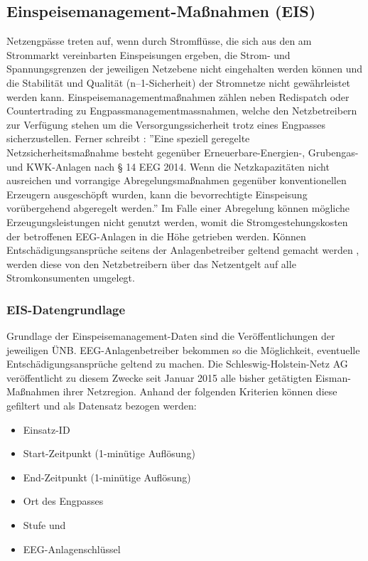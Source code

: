 \documentclass[onecolumn,10pt,titlepage]{article}
\begin{document}
\subsection{Einspeisemanagement-Maßnahmen (EIS)}
Netzengpässe treten auf, wenn durch Stromflüsse, die sich aus den am Strommarkt vereinbarten Einspeisungen ergeben, die Strom- und Spannungsgrenzen der jeweiligen Netzebene  nicht eingehalten werden können und die Stabilität und Qualität (n–1-Sicherheit) der Stromnetze nicht gewährleistet werden kann. Einspeisemanagementmaßnahmen zählen neben Redispatch oder Countertrading zu Engpassmanagementmassnahmen, welche den Netzbetreibern zur Verfügung stehen um die Versorgungssicherheit trotz eines Engpasses sicherzustellen. Ferner schreibt \cite{Zapf.2017}: ''Eine speziell geregelte Netzsicherheitsmaßnahme besteht gegenüber Erneuerbare-Energien-, Grubengas- und KWK-Anlagen nach § 14 EEG 2014. Wenn die Netzkapazitäten nicht ausreichen und vorrangige Abregelungsmaßnahmen gegenüber konventionellen Erzeugern ausgeschöpft wurden, kann die bevorrechtigte Einspeisung vorübergehend abgeregelt werden.'' Im Falle einer Abregelung können mögliche Erzeugungsleistungen nicht genutzt werden, womit die Stromgestehungskosten der betroffenen EEG-Anlagen in die Höhe getrieben werden. Können Entschädigungsansprüche seitens der Anlagenbetreiber geltend gemacht werden , werden diese von den Netzbetreibern über das Netzentgelt auf alle Stromkonsumenten umgelegt.
\subsubsection{EIS-Datengrundlage}
Grundlage der Einspeisemanagement-Daten sind die Veröffentlichungen der jeweiligen ÜNB. EEG-Anlagenbetreiber bekommen so die Möglichkeit, eventuelle Entschädigungsansprüche geltend zu machen. Die Schleswig-Holstein-Netz AG veröffentlicht zu diesem Zwecke seit Januar 2015 alle bisher getätigten Eisman-Maßnahmen ihrer Netzregion. Anhand der folgenden Kriterien können diese gefiltert und als Datensatz bezogen werden: \cite{SchleswigHolstenNetzAG.31.Januar2019}

\begin{itemize}
	\item Einsatz-ID
	\item Start-Zeitpunkt (1-minütige Auflösung)
	\item End-Zeitpunkt (1-minütige Auflösung)
	\item Ort des Engpasses
	\item Stufe und
	\item EEG-Anlagenschlüssel
\end{itemize}
\end{document}
